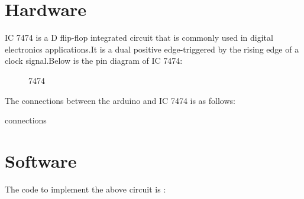 \documentclass{article}
\begin{document}
\section{Hardware}

	IC 7474 is a D flip-flop integrated circuit that is commonly used in digital electronics applications.It is a dual positive edge-triggered by the rising edge of a clock signal.Below is the pin diagram of IC 7474:
	\begin{figure}[h]
		\centering
		
		\caption{7474}
		\label{fig:2}
	\end{figure}


The connections between the arduino and IC 7474 is as follows:
	\begin{table}[h]
		\begin{center}
			
			\caption{connections}
			\label{table:3}
		\end{center}
	\end{table}


\section{Software}

The code to implement the above circuit is : \\

		
\end{document}
